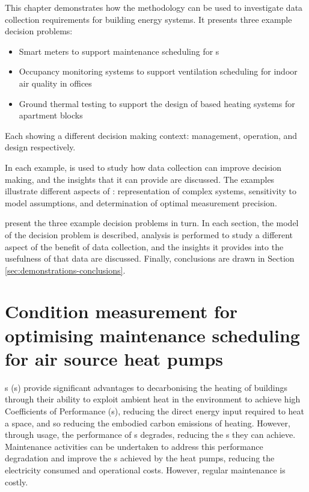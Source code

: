 This chapter demonstrates how the  methodology can be used to investigate data collection requirements for building energy systems. It presents three example decision problems:
\begin{itemize}
    \item Smart meters to support maintenance scheduling for s
    \item Occupancy monitoring systems to support ventilation scheduling for indoor air quality in offices
    \item Ground thermal testing to support the design of  based heating systems for apartment blocks
\end{itemize}
Each showing a different decision making context: management, operation, and design respectively.

In each example,  is used to study how data collection can improve decision making, and the insights that it can provide are discussed. The examples illustrate different aspects of : representation of complex systems, sensitivity to model assumptions, and determination of optimal measurement precision.

 present the three example decision problems in turn. In each section, the model of the decision problem is described,  analysis is performed to study a different aspect of the benefit of data collection, and the insights it provides into the usefulness of that data are discussed. Finally, conclusions are drawn in Section \ref{sec:demonstrations-conclusions}.


\newpage

\section[\glsxtrshort{ashp} maintenance scheduling]{Condition measurement for optimising maintenance scheduling for air source heat pumps} \label{sec:ashp}

s (s) provide significant advantages to decarbonising the heating of buildings through their ability to exploit ambient heat in the environment to achieve high Coefficients of Performance (s), reducing the direct energy input required to heat a space, and so reducing the embodied carbon emissions of heating. However, through usage, the performance of s degrades, reducing the s they can achieve. Maintenance activities can be undertaken to address this performance degradation and improve the s achieved by the heat pumps, reducing the electricity consumed and operational costs. However, regular maintenance is costly.

